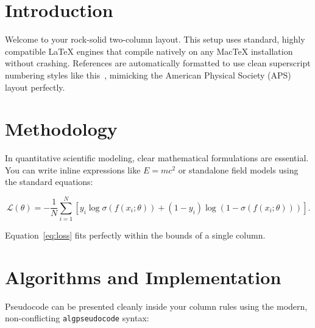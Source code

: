 \documentclass[11pt,twocolumn]{article}
\begin{document}




\section{Introduction}
Welcome to your rock-solid two-column layout. This setup uses standard, highly compatible LaTeX engines that compile natively on any MacTeX installation without crashing. References are automatically formatted to use clean superscript numbering styles like this~\cite{attention2017}, mimicking the American Physical Society (APS) layout perfectly.

\section{Methodology}
In quantitative scientific modeling, clear mathematical formulations are essential. You can write inline expressions like $E = mc^2$ or standalone field models using the standard equations:

\begin{equation}
    \mathcal{L}(\theta) = -\frac{1}{N} \sum_{i=1}^{N} \left[ y_i \log \sigma(f(x_i; \theta)) + (1 - y_i) \log (1 - \sigma(f(x_i; \theta))) \right].
    \label{eq:loss}
\end{equation}

Equation~\ref{eq:loss} fits perfectly within the bounds of a single column.

\section{Algorithms and Implementation}
Pseudocode can be presented cleanly inside your column rules using the modern, non-conflicting \texttt{algpseudocode} syntax:
\end{document}
